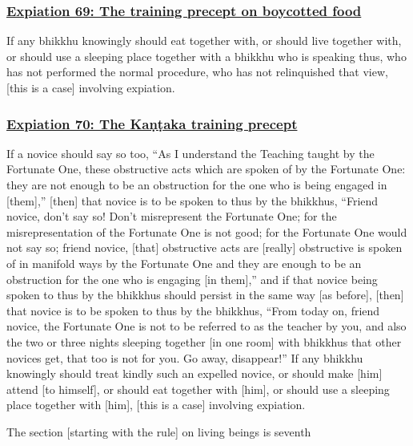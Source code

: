 \subsubsection*{\hyperref[pac69]{Expiation 69: The training precept on boycotted food}}
\label{exp69}
If any bhikkhu knowingly should eat together with, or should live together with, or should use a sleeping place together with a bhikkhu who is speaking thus, who has not performed the normal procedure, who has not relinquished that view, [this is a case] involving expiation.



\subsubsection*{\hyperref[pac70]{Expiation 70: The Kaṇṭaka training precept}}
\label{exp70}
If a novice should say so too, ``As I understand the Teaching taught by the Fortunate One, these obstructive acts which are spoken of by the Fortunate One: they are not enough to be an obstruction for the one who is being engaged in [them],'' [then] that novice is to be spoken to thus by the bhikkhus, ``Friend novice, don't say so! Don't misrepresent the Fortunate One; for the misrepresentation of the Fortunate One is not good; for the Fortunate One would not say so; friend novice, [that] obstructive acts are [really] obstructive is spoken of in manifold ways by the Fortunate One and they are enough to be an obstruction for the one who is engaging [in them],'' and if that novice being spoken to thus by the bhikkhus should persist in the same way [as before], [then] that novice is to be spoken to thus by the bhikkhus, ``From today on, friend novice, the Fortunate One is not to be referred to as the teacher by you, and also the two or three nights sleeping together [in one room] with bhikkhus that other novices get, that too is not for you. Go away, disappear!'' If any bhikkhu knowingly should treat kindly such an expelled novice, or should make [him] attend [to himself], or should eat together with [him], or should use a sleeping place together with [him], [this is a case] involving expiation.

\begin{center}
	The section [starting with the rule] on living beings is seventh
\end{center}



\setsubsecheadstyle{\subsectionFmt}
